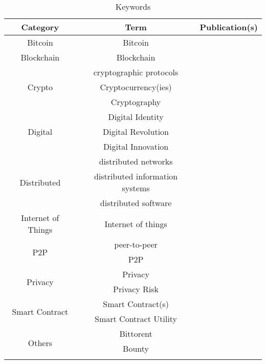 \begin{longtable}{ |c|c|p{4cm}| }
	\caption{Keywords} \\
	\hline
 	\textbf{Category} & \textbf{Term} & \textbf{Publication(s)} \\ [0.5ex] 
 	\hline\hline
 	Bitcoin & Bitcoin & \cite{2016_Jacynycz,2017_Ouaddah,2015_Zyskind}\\ 
	 \hline
	 Blockchain & Blockchain & \cite{2015_Dennis,2015_Zyskind,2016_Bahga,2016_Jacynycz,2016_Sharples,2016_Tian,2016_Yasin,2016_Yue,2017_Coyne,2017_Gipp,2017_Madhwal,2017_Ouaddah,2018_Alessandra}\\ 
	 \hline
	 \multirow{3}{*}{Crypto} & cryptographic protocols & \cite{2016_Azaria,2015_Dennis} \\ \cline{2-3}
	 & Cryptocurrency(ies) & \cite{2016_Jacynycz,2017_Ouaddah}\\ \cline{2-3}
	 & Cryptography & \cite{2016_Kianmajd}\\
	 \hline
	  \multirow{3}{*}{Digital} & Digital Identity & \cite{2016_Yasin}\\ \cline{2-3}
	  & Digital Revolution & \multirow{2}{*}{\cite{2018_Alessandra}} \\ \cline{2-2}
	  & Digital Innovation & \\
	 \hline
	 \multirow{3}{*}{Distributed} & distributed networks & \cite{2015_Dennis}\\ \cline{2-3}
	  & distributed information systems
& \cite{2016_Azaria}\\ \cline{2-3}
	  & distributed software & \cite{2016_Jacynycz}\\
	 \hline
 	Internet of Things & Internet of things & \cite{2016_Bahga,2017_Jaag,2016_Kianmajd}\\ 
	 \hline
	  \multirow{2}{*}{P2P} & peer-to-peer & \cite{2015_Dennis}\\ \cline{2-3} 
	  & P2P & \cite{2016_Jacynycz}\\
	 \hline
	 \multirow{2}{*}{Privacy} & Privacy & \cite{2017_Ouaddah,2015_Zyskind}\\  \cline{2-3}
	 & Privacy Risk & \cite{2016_Yue} \\
	 \hline
	 \multirow{2}{*}{Smart Contract} & Smart Contract(s) & \cite{2016_Bahga,2016_Jacynycz}\\ \cline{2-3}
	 & Smart Contract Utility & \cite{2016_Yasin} \\
	 \hline
	 \multirow{14}{*}{Others} & Bittorent  & \cite{2015_Dennis} \\ \cline{2-3}
	 & Bounty & \multirow{2}{*}{\cite{2016_Jacynycz}} \\ \cline{2-2}

\end{longtable}
